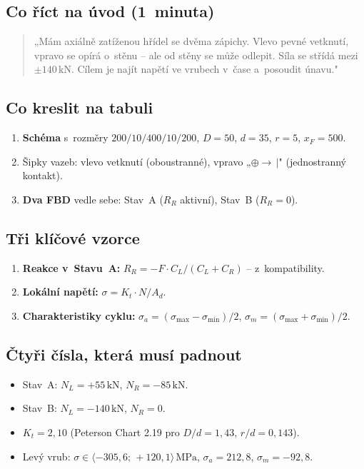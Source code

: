 \documentclass[a4paper,11pt]{article}
\newcommand{\unit}[1]{\,\mathrm{#1}}
\begin{document}
\subsection{Co říct na úvod (1~minuta)}

\begin{quote}
„Mám axiálně zatíženou hřídel se dvěma zápichy. Vlevo pevné vetknutí, vpravo se opírá o~stěnu -- ale od stěny se může odlepit. Síla se střídá mezi $\pm 140\unit{kN}$. Cílem je najít napětí ve vrubech v~čase a~posoudit únavu."
\end{quote}

\subsection{Co kreslit na tabuli}

\begin{enumerate}[nosep]
    \item \textbf{Schéma} s~rozměry $200/10/400/10/200$, $D=50$, $d=35$, $r=5$, $x_F=500$.
    \item Šipky vazeb: vlevo vetknutí (oboustranné), vpravo „$\oplus\to\,|$" (jednostranný kontakt).
    \item \textbf{Dva FBD} vedle sebe: Stav~A ($R_R$ aktivní), Stav~B ($R_R = 0$).
\end{enumerate}

\subsection{Tři klíčové vzorce}

\begin{enumerate}[nosep]
    \item \textbf{Reakce v~Stavu~A:} $R_R = -F\cdot C_L/(C_L+C_R)$ -- z~kompatibility.
    \item \textbf{Lokální napětí:} $\sigma = K_t \cdot N/A_d$.
    \item \textbf{Charakteristiky cyklu:} $\sigma_a = (\sigma_{\max}-\sigma_{\min})/2$, $\sigma_m = (\sigma_{\max}+\sigma_{\min})/2$.
\end{enumerate}

\subsection{Čtyři čísla, která musí padnout}

\begin{itemize}[nosep]
    \item Stav~A: $N_L = +55\unit{kN}$, $N_R = -85\unit{kN}$.
    \item Stav~B: $N_L = -140\unit{kN}$, $N_R = 0$.
    \item $K_t = 2{,}10$ (Peterson Chart 2.19 pro $D/d = 1{,}43$, $r/d = 0{,}143$).
    \item Levý vrub: $\sigma \in \langle -305{,}6;\,+120{,}1\rangle\unit{MPa}$, $\sigma_a = 212{,}8$, $\sigma_m = -92{,}8$.
\end{itemize}
\end{document}
